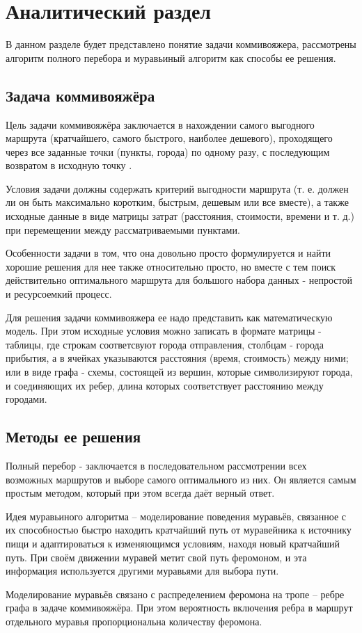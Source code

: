 \chapter{Аналитический раздел}
\label{cha:analysis}
В данном разделе будет представлено понятие задачи коммивояжера, рассмотрены алгоритм полного перебора и муравьиный алгоритм как способы ее решения.

\section{Задача коммивояжёра}
\label{sec:salesman}
Цель задачи коммивояжёра заключается в нахождении самого выгодного маршрута (кратчайшего, самого быстрого, наиболее дешевого), проходящего через все заданные точки (пункты, города) по одному разу, с последующим возвратом в исходную точку \cite{salesman}.
\par Условия задачи должны содержать критерий выгодности маршрута (т. е. должен ли он быть максимально коротким, быстрым, дешевым или все вместе), а также исходные данные в виде матрицы затрат (расстояния, стоимости, времени и т. д.) при перемещении между рассматриваемыми пунктами. 
\par Особенности задачи в том, что она довольно просто формулируется и найти хорошие решения для нее также относительно просто, но вместе с тем поиск действительно оптимального маршрута для большого набора данных - непростой и ресурсоемкий процесс. 
\par Для решения задачи коммивояжера ее надо представить как математическую модель. При этом исходные условия можно записать в формате матрицы - таблицы, где строкам соответсвуют города отправления, столбцам - города прибытия, а в ячейках указываются расстояния (время, стоимость) между ними; или в виде графа - схемы, состоящей из вершин, которые символизируют города, и соединяющих их ребер, длина которых соответствует расстоянию между городами.

\section{Методы ее решения}
\label{sec:methods}
Полный перебор - заключается в последовательном рассмотрении всех возможных маршрутов и выборе самого оптимального из них. Он является самым простым методом, который при этом всегда даёт верный ответ.
\par Идея муравьиного алгоритма -- моделирование поведения муравьёв, связанное с их способностью быстро находить кратчайший путь от муравейника к источнику пищи и адаптироваться к изменяющимся условиям, находя новый кратчайший путь. При своём движении муравей метит свой путь феромоном, и эта информация используется другими муравьями для выбора пути\cite{ulyanov}. 
\par Моделирование муравьёв связано с распределением феромона на тропе -- ребре графа в задаче коммивояжёра. При этом вероятность включения ребра в маршрут отдельного муравья пропорциональна количеству феромона.

